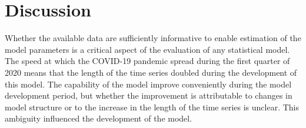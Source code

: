 \documentclass[12pt,letterpaper]{article}
\begin{document}
\clearpage
\section*{Discussion}

Whether the available data are sufficiently informative to enable
estimation of the model parameters is a critical aspect of the
evaluation of any statistical model.
The speed at which the COVID-19 pandemic spread during the first
quarter of
2020 means that the length of the time series doubled during
the development of this model. The capability of the
model improve conveniently during the model development period,
but whether the improvement is
attributable to changes in model structure or to the increase in the
length of the time series is unclear. This ambiguity influenced the
development of the model.

\cite{Sibert2017,Nielsen2014b,Chen2020,Baudin2010}

\clearpage
\end{document}
